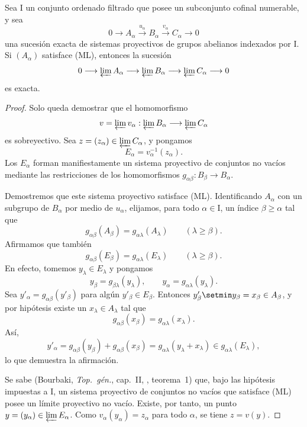 \documentclass[oneside]{amsart}
\renewcommand{\geq}{\geqslant}
\let\EGAOriginalLabel\label
\renewcommand{\label}[1]{\phantomsection\EGAOriginalLabel{#1}}
\begin{document}
\begin{proposition}[13.2.2]
\label{0.13.2.2}
Sea $\mathrm{I}$ un conjunto ordenado filtrado que posee un subconjunto
cofinal \textup{numerable}, y sea
\[
  0\longrightarrow A_\alpha
  \xrightarrow{u_\alpha}B_\alpha
  \xrightarrow{v_\alpha}C_\alpha
  \longrightarrow0
\]
una sucesión exacta de sistemas proyectivos de grupos abelianos indexados
por $\mathrm{I}$.
Si $(A_\alpha)$ satisface {\rm(ML)}, entonces la sucesión
\[
  0\longrightarrow\varprojlim A_\alpha
  \longrightarrow\varprojlim B_\alpha
  \longrightarrow\varprojlim C_\alpha
  \longrightarrow0
\]
es exacta.
\end{proposition}

\begin{proof}
Solo queda demostrar que el homomorfismo
\[
  v=\varprojlim v_\alpha:
  \varprojlim B_\alpha\longrightarrow\varprojlim C_\alpha
\]
es sobreyectivo.
Sea $z=(z_\alpha)\in\varprojlim C_\alpha$, y pongamos
\[
  E_\alpha=v_\alpha^{-1}(z_\alpha).
\]
Los $E_\alpha$ forman manifiestamente un sistema proyectivo de conjuntos no
vacíos mediante las restricciones de los homomorfismos
$g_{\alpha\beta}:B_\beta\longrightarrow B_\alpha$.

Demostremos que este sistema proyectivo satisface (ML).
Identificando $A_\alpha$ con un subgrupo de $B_\alpha$ por medio de
$u_\alpha$, elijamos, para todo $\alpha\in\mathrm{I}$, un índice
$\beta\geq\alpha$ tal que
\[
  g_{\alpha\beta}(A_\beta)
  =
  g_{\alpha\lambda}(A_\lambda)
  \qquad(\lambda\geq\beta).
\]
Afirmamos que también
\[
  g_{\alpha\beta}(E_\beta)
  =
  g_{\alpha\lambda}(E_\lambda)
  \qquad(\lambda\geq\beta).
\]
En efecto, tomemos $y_\lambda\in E_\lambda$ y pongamos
\[
  y_\beta=g_{\beta\lambda}(y_\lambda),
  \qquad
  y_\alpha=g_{\alpha\lambda}(y_\lambda).
\]
Sea $y'_\alpha=g_{\alpha\beta}(y'_\beta)$ para algún
$y'_\beta\in E_\beta$.
Entonces $y'_\beta\setmin y_\beta=x_\beta\in A_\beta$, y por hipótesis existe
un $x_\lambda\in A_\lambda$ tal que
\[
  g_{\alpha\beta}(x_\beta)
  =
  g_{\alpha\lambda}(x_\lambda).
\]
Así,
\[
  y'_\alpha
  =
  g_{\alpha\beta}(y_\beta)+g_{\alpha\beta}(x_\beta)
  =
  g_{\alpha\lambda}(y_\lambda+x_\lambda)
  \in g_{\alpha\lambda}(E_\lambda),
\]
lo que demuestra la afirmación.

Se sabe (Bourbaki, \emph{Top.\ g\'{e}n.}, cap.~II,
, teorema~1) que, bajo las hipótesis impuestas a
$\mathrm{I}$, un sistema proyectivo de conjuntos no vacíos que satisface (ML)
posee un límite proyectivo no vacío.
Existe, por tanto, un punto
$y=(y_\alpha)\in\varprojlim E_\alpha$.
Como $v_\alpha(y_\alpha)=z_\alpha$ para todo $\alpha$, se tiene
$z=v(y)$.
\end{proof}
\end{document}
